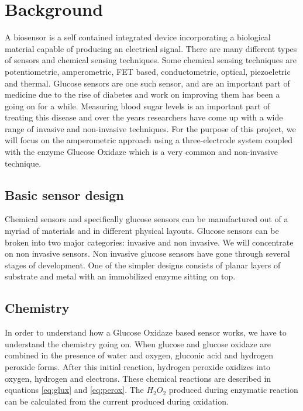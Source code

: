 \section{Background}
A biosensor is a self contained integrated device incorporating a biological material capable of producing an electrical signal. There are many different types of sensors and chemical sensing techniques. Some chemical sensing techniques are potentiometric, amperometric, FET based, conductometric, optical, piezoeletric and thermal. Glucose sensors are one such sensor, and are an important part of medicine due to the rise of diabetes and work on improving them has been a going on for a while. \cite{Cramp:1967} Measuring blood sugar levels is an important part of treating this disease and over the years researchers have come up with a wide range of invasive and non-invasive techniques. \cite{Oliver:2009} For the purpose of this project, we will focus on the amperometric approach using a three-electrode system coupled with the enzyme Glucose Oxidaze which is a very common and non-invasive technique. \cite{Cui:2001} \cite{Jui-Lin:2011} 

\subsection{Basic sensor design}
Chemical sensors and specifically glucose sensors can be manufactured out of a myriad of materials and in different physical layouts. Glucose sensors can be broken into two major categories: invasive and non invasive. We will concentrate on non invasive sensors. Non invasive glucose sensors have gone through several stages of development. \cite{Wang:2012} One of the simpler designs consists of planar layers of substrate and metal with an immobilized enzyme sitting on top.

\subsection{Chemistry}
In order to understand how a Glucose Oxidaze based sensor works, we have to understand the chemistry going on. When glucose and glucose oxidaze are combined in the presence of water and oxygen, gluconic acid and hydrogen peroxide forms. After this initial reaction, hydrogen peroxide oxidizes into oxygen, hydrogen and electrons. These chemical reactions are described in equations \ref{eq:glux} and \ref{eq:perox}. The $ H_{2}O_{2}$ produced during enzymatic reaction can be calculated from the current produced during oxidation.

